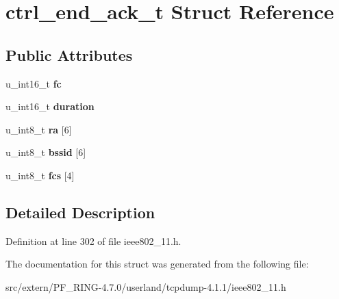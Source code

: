 \hypertarget{structctrl__end__ack__t}{
\section{ctrl\_\-end\_\-ack\_\-t Struct Reference}
\label{structctrl__end__ack__t}
}
\subsection*{Public Attributes}
\begin{DoxyCompactItemize}
\item 
\hypertarget{structctrl__end__ack__t_ab22f4102af9a5ba8c4518583a5d617b2}{
u\_\-int16\_\-t {\bfseries fc}}
\label{structctrl__end__ack__t_ab22f4102af9a5ba8c4518583a5d617b2}

\item 
\hypertarget{structctrl__end__ack__t_a0b9b853db9e57c600e6bfe1976f33984}{
u\_\-int16\_\-t {\bfseries duration}}
\label{structctrl__end__ack__t_a0b9b853db9e57c600e6bfe1976f33984}

\item 
\hypertarget{structctrl__end__ack__t_a51c36775ea43f44344cb6e8b5c2a2e70}{
u\_\-int8\_\-t {\bfseries ra} \mbox{[}6\mbox{]}}
\label{structctrl__end__ack__t_a51c36775ea43f44344cb6e8b5c2a2e70}

\item 
\hypertarget{structctrl__end__ack__t_accf419344584f17e3d09cce7c17be721}{
u\_\-int8\_\-t {\bfseries bssid} \mbox{[}6\mbox{]}}
\label{structctrl__end__ack__t_accf419344584f17e3d09cce7c17be721}

\item 
\hypertarget{structctrl__end__ack__t_ae8955ec18ef723705cf634d34ac8fac4}{
u\_\-int8\_\-t {\bfseries fcs} \mbox{[}4\mbox{]}}
\label{structctrl__end__ack__t_ae8955ec18ef723705cf634d34ac8fac4}

\end{DoxyCompactItemize}


\subsection{Detailed Description}


Definition at line 302 of file ieee802\_\-11.h.



The documentation for this struct was generated from the following file:\begin{DoxyCompactItemize}
\item 
src/extern/PF\_\-RING-\/4.7.0/userland/tcpdump-\/4.1.1/ieee802\_\-11.h\end{DoxyCompactItemize}
